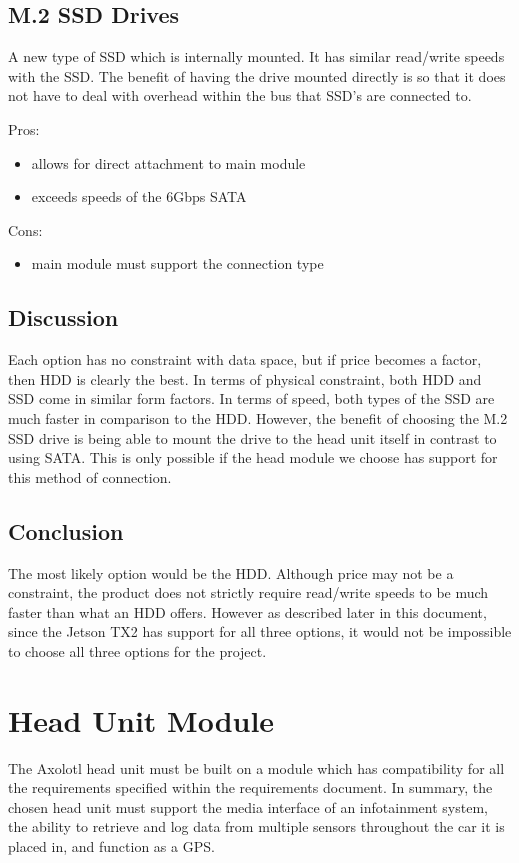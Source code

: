 \documentclass[onecolumn, draftclsnofoot,10pt, compsoc]{IEEEtran}
\begin{document}
\subsection{M.2 SSD Drives}
A new type of SSD which is internally mounted. It has similar read/write speeds with the SSD. The benefit of having the drive mounted directly is so that it does not have to deal with overhead within the bus that SSD's are connected to. 
~\cite{m.2:information}
~\cite{m.2:information2}

Pros:
\begin{itemize}
    \item allows for direct attachment to main module
    \item exceeds speeds of the 6Gbps SATA
\end{itemize}

Cons:
\begin{itemize}
    \item main module must support the connection type
\end{itemize}

\subsection{Discussion}
Each option has no constraint with data space, but if price becomes a factor, then HDD is clearly the best.
In terms of physical constraint, both HDD and SSD come in similar form factors.
In terms of speed, both types of the SSD are much faster in comparison to the HDD. 
However, the benefit of choosing the M.2 SSD drive is being able to mount the drive to the head unit itself in contrast to using SATA. This is only possible if the head module we choose has support for this method of connection.

\subsection{Conclusion}
The most likely option would be the HDD. Although price may not be a constraint, the product does not strictly require read/write speeds to be much faster than what an HDD offers. However as described later in this document, since the Jetson TX2 has support for all three options, it would not be impossible to choose all three options for the project.

\section{Head Unit Module}
The Axolotl head unit must be built on a module which has compatibility for all the requirements specified within the requirements document. In summary, the chosen head unit must support the media interface of an infotainment system, the ability to retrieve and log data from multiple sensors throughout the car it is placed in, and function as a GPS. 
\end{document}
